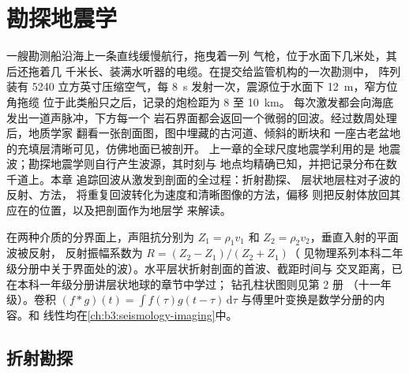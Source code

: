\chapter{勘探地震学}\label{ch:b3:exploration-seismology}

一艘勘测船沿海上一条直线缓慢航行，拖曳着一列
气枪，位于水面下几米处，其后还拖着几
千米长、装满水听器的电缆。在提交给监管机构的一次勘测中，
阵列装有 \num{5240} 立方英寸压缩空气，每
\qty{8}{s} 发射一次，震源位于水面下 \qty{12}{m}，窄方位角拖缆
位于此类船只之后，记录的炮检距为 8 至 \qty{10}{km}。
每次激发都会向海底发出一道声脉冲，下方每一个
岩石界面都会返回一个微弱的回波。经过数周处理后，地质学家
翻看一张剖面图，图中埋藏的古河道、倾斜的断块和
一座古老盆地的充填层清晰可见，仿佛地面已被剖开。
上一章的全球尺度地震学利用的是
地震波；勘探地震学则自行产生波源，其时刻与
地点均精确已知，并把记录分布在数千道上。本章
追踪回波从激发到剖面的全过程：折射勘探、
层状地层柱对子波的反射、方法，
将重复回波转化为速度和清晰图像的方法，偏移
则把反射体放回其应在的位置，以及把剖面作为地层学
来解读。

\begin{recall}
在两种介质的分界面上，声阻抗分别为 $Z_1 = \rho_1v_1$ 和
$Z_2 = \rho_2v_2$，垂直入射的平面波被反射，
反射振幅系数为 $R = (Z_2 - Z_1)/(Z_2 + Z_1)$（
见物理系列本科二年级分册中关于界面处的波）。水平层状折射剖面的首波、截距时间与
交叉距离，已在本科一年级分册讲层状地球的章节中学过；
钻孔柱状图则见第 2 册
（十一年级）。卷积 $(f*g)(t) = \int f(\tau)g(t - \tau)\,\mathrm d\tau$
与傅里叶变换是数学分册的内容。和
线性均在\cref{ch:b3:seismology-imaging}中。
\end{recall}

\section{折射勘探}

